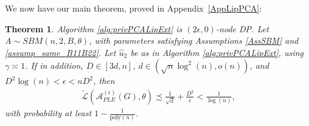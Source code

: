 \documentclass{article}
\newtheorem{theorem}{Theorem}
\newcommand{\mprob}{\mathbb{P}}
\newcommand{\Tr}{\ensuremath{\mathrm{Tr}}}
\begin{document}

We now have our main theorem, proved in Appendix~\ref{AppLipPCA}:

\begin{theorem}
\label{theorem:Lip_PCA_Main}
Algorithm \ref{alg:privPCALipExt} is $(2\epsilon, 0)$-node DP. Let $A \sim SBM(n, 2, B, \theta)$, with parameters satisfying Assumptions \ref{AssSBM} and \ref{assump_same_B11B22}. Let $\hat{u}_2$ be as in Algorithm \ref{alg:privPCALipExt}, using $\gamma \asymp 1$. If in addition, $D \in [3d, n]$, $d \in (\sqrt{n}\log^2(n), o(n))$, and $D^2\log(n) < \epsilon < nD^2$, then
\begin{align*}
\widetilde{\mathcal{L}}\left(\mathcal{A}_{PLE}^{(\epsilon)}(G), \theta\right) \precsim \frac{1}{\sqrt{d}} + \frac{D^2}{\epsilon} < \frac{1}{\log(n)},
\end{align*}
with probability at least $1 - \frac{1}{\mathrm{poly}(n)}$.
\end{theorem}
\end{document}
